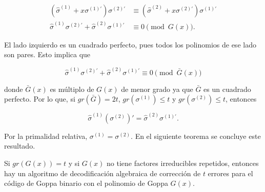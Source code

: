 \begin{align*} 
    \left( \hat{\sigma}^{(1)} + x \sigma^{(1)'} \right) \sigma^{(2)'} &\equiv \left( \hat{\sigma}^{(2)} + x \sigma^{(2)'} \right) \sigma^{(1)'}\\ 
    \hat{\sigma}^{(1)} \sigma^{(2)'} + \hat{\sigma}^{(2)} \sigma^{(1)'} &\equiv 0 \pmod{G(x)}.
\end{align*}

El lado izquierdo es un cuadrado perfecto, pues todos los polinomios de ese lado son pares. Esto implica que

$$\hat{\sigma}^{(1)} \sigma^{(2)'} + \hat{\sigma}^{(2)} \sigma^{(1)'} \equiv 0 \pmod{\bar{G}(x)}$$

donde $\bar{G}(x)$ es múltiplo de $G(x)$ de menor grado ya que $\bar{G}$ es un cuadrado perfecto. Por lo que, si $gr(\bar{G}) = 2t$, $gr(\sigma^{(1)}) \leq t$ y $gr(\sigma^{(2)}) \leq t$, entonces 

$$\hat{\sigma}^{(1)} \left( \sigma^{(2)} \right) ' = \hat{\sigma}^{(2)} \sigma^{(1)'}.$$

Por la primalidad relativa, $\sigma^{(1)} = \sigma^{(2)}$. En el siguiente teorema se concluye este resultado.

\begin{theorem}
    Si $gr(G(x)) = t$ y si $G(x)$ no tiene factores irreducibles repetidos, entonces hay un algoritmo de decodificación algebraica de corrección de $t$ errores para el código de Goppa binario con el polinomio de Goppa $G(x)$.
\end{theorem}

